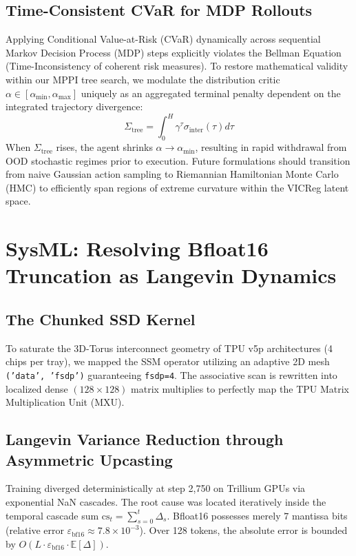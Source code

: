 \documentclass[11pt]{article}
\newcommand{\E}{\mathbb{E}}
\begin{document}
\subsection{Time-Consistent CVaR for MDP Rollouts}
Applying Conditional Value-at-Risk (CVaR) dynamically across sequential Markov Decision Process (MDP) steps explicitly violates the Bellman Equation (Time-Inconsistency of coherent risk measures). To restore mathematical validity within our MPPI tree search, we modulate the distribution critic $\alpha \in [\alpha_\text{min}, \alpha_\text{max}]$ uniquely as an aggregated terminal penalty dependent on the integrated trajectory divergence:
\begin{equation}
  \Sigma_\text{tree} = \int_{0}^{H} \gamma^\tau \sigma_\text{inter}(\tau) d\tau
\end{equation}
When $\Sigma_\text{tree}$ rises, the agent shrinks $\alpha \to \alpha_\text{min}$, resulting in rapid withdrawal from OOD stochastic regimes prior to execution. Future formulations should transition from naive Gaussian action sampling to Riemannian Hamiltonian Monte Carlo (HMC) to efficiently span regions of extreme curvature within the VICReg latent space.

\section{SysML: Resolving Bfloat16 Truncation as Langevin Dynamics}

\subsection{The Chunked SSD Kernel}
To saturate the 3D-Torus interconnect geometry of TPU v5p architectures (4 chips per tray), we mapped the SSM operator utilizing an adaptive 2D mesh \texttt{('data', 'fsdp')} guaranteeing \texttt{fsdp=4}. The associative scan is rewritten into localized dense $(128 \times 128)$ matrix multiplies to perfectly map the TPU Matrix Multiplication Unit (MXU).

\subsection{Langevin Variance Reduction through Asymmetric Upcasting}
Training diverged deterministically at step 2,750 on Trillium GPUs via exponential NaN cascades. The root cause was located iteratively inside the temporal cascade sum $\text{cs}_t = \sum_{s=0}^t \Delta_s$. Bfloat16 possesses merely $7$ mantissa bits (relative error $\varepsilon_{\text{bf}16} \approx 7.8 \times 10^{-3}$). Over 128 tokens, the absolute error is bounded by $O(L \cdot \varepsilon_{\text{bf}16} \cdot \E[\Delta])$.
\end{document}
